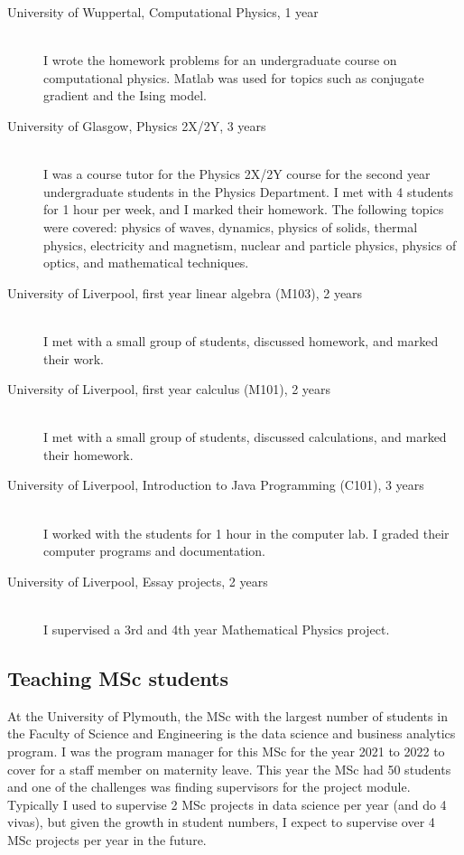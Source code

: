 \documentclass[12pt]{article}
\begin{document}
\begin{description}
  \item[University of Wuppertal, Computational Physics, 1 year] \hfill \\
I wrote
the homework problems for an 
undergraduate course on computational
physics. Matlab was used for topics such as conjugate gradient
and the Ising model.

  \item[University of Glasgow, Physics 2X/2Y, 3 years] \hfill \\
I was a course tutor for the Physics 2X/2Y course
for the second year undergraduate students
in the Physics Department. I met with 4 students for 1 hour per week,
and I marked their homework.
The following topics were covered:
physics of waves, dynamics, physics of solids, thermal physics,
electricity and magnetism, nuclear and particle physics, physics of
optics, and mathematical techniques.

\item[University of Liverpool, first year linear algebra
 (M103), 2 years] \hfill \\
I met with a small group of students, discussed homework,
and marked their work.

\item[University of Liverpool, first year calculus (M101), 2 years] \hfill \\
I met with a small group of students, discussed calculations,
and marked their homework.



\item[University of Liverpool, Introduction to Java Programming
 (C101), 3 years] \hfill \\
I worked with the students for 1 hour in the computer lab.
I graded their computer programs and documentation.



\item[University of Liverpool, Essay projects, 2 years] \hfill \\
I supervised a 3rd and 4th year Mathematical Physics project.

\end{description}

\subsection{Teaching MSc students}

At the University of Plymouth, the MSc with the largest
number of students in the Faculty of Science and Engineering
is the data science and business analytics program. I was the 
program manager for this MSc for the year 
2021 to 2022 to cover for a staff member
on maternity leave. This year the MSc had 50 students and one
of the challenges was finding supervisors for the project module.
Typically I used to supervise 2 MSc projects in data science per year (and do
4 vivas), but given the growth in student numbers,
I expect to supervise over 4 MSc projects per year in the future.
\end{document}

